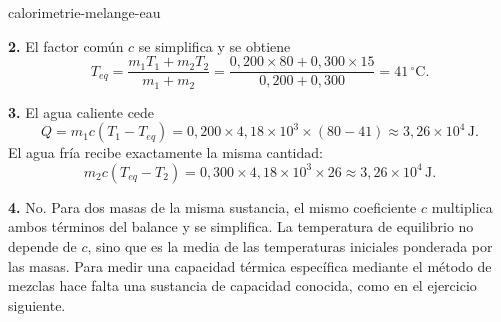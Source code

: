 \begin{exo}{calorimetrie-melange-eau}
\begin{solution}
\textbf{2.} El factor común $c$ se simplifica y se obtiene
\[
T_{eq}=\frac{m_1T_1+m_2T_2}{m_1+m_2}
=\frac{0{,}200\times80+0{,}300\times15}{0{,}200+0{,}300}
=41\,^\circ\text{C}.
\]

\textbf{3.} El agua caliente cede
\[
Q=m_1c(T_1-T_{eq})
=0{,}200\times4{,}18\times10^3\times(80-41)
\approx3{,}26\times10^4\,\text{J}.
\]
El agua fría recibe exactamente la misma cantidad:
\[
m_2c(T_{eq}-T_2)=0{,}300\times4{,}18\times10^3\times26
\approx3{,}26\times10^4\,\text{J}.
\]

\textbf{4.} No. Para dos masas de la misma sustancia, el mismo coeficiente $c$ multiplica ambos términos del balance y se simplifica. La temperatura de equilibrio no depende de $c$, sino que es la media de las temperaturas iniciales ponderada por las masas. Para medir una capacidad térmica específica mediante el método de mezclas hace falta una sustancia de capacidad conocida, como en el ejercicio siguiente.
\end{solution}
\end{exo}

